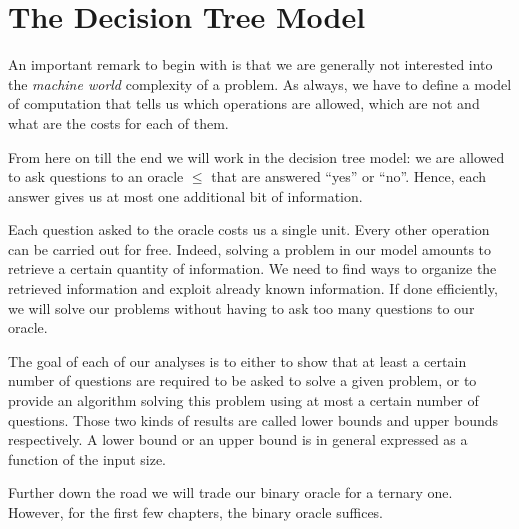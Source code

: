 \section{The Decision Tree Model}
\label{tree:sorting:model}

An important remark to begin with is that we are generally not interested
into the \emph{machine world} complexity of a problem. As always, we have to
define a model of computation that tells us which operations are allowed, which
are not and what are the costs for each of them.

From here on till the end we will work in the decision tree model:
we are allowed to ask questions to an oracle \(\le\) that are answered
``yes'' or ``no''. Hence, each answer gives us at most
one additional bit of information.

Each question asked to the oracle costs us a single unit.
Every other operation can be carried out for free. Indeed, solving a problem in
our model amounts to retrieve a certain quantity of information. We
need to find ways to organize the retrieved information and exploit already
known information. If done efficiently, we will solve our problems without
having to ask too many questions to our oracle.

The goal of each of our analyses is to either to show that at least a certain
number of questions are required to be asked to solve a given problem, or to
provide an algorithm solving this problem using at most a certain number of
questions. Those two kinds of results are called lower bounds and upper bounds
respectively. A lower bound or an upper bound is in general expressed as
a function of the input size.

Further down the road we will trade our binary oracle for a ternary one.
However, for the first few chapters, the binary oracle suffices.

